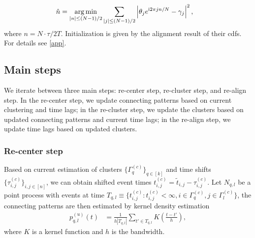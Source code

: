 	\begin{equation}
	\begin{aligned}\label{eq:time shift}
	\hat n&=
	\underset{|n|\leq (N-1)/2}{\arg\min}
	\sum_{|j|\leq (N-1)/2}
	\left| \theta_{j}e^{\complexunit 2\pi j n/N}
	-\gamma_{j} \right|^2
	,
	\end{aligned}
	\end{equation}
where $n=N\cdot\tau/2T$.
Initialization is given by the alignment result of their cdfs.
For details see \ref{app}.





\subsection{Main steps}
We iterate between three main steps: re-center step, re-cluster step, and re-align step.
In the re-center step, we update connecting patterns based on current clustering  and time lags; 
in the re-cluster step, we update the clusters based on updated connecting patterns and current time lags;
in the re-align step, we update time lags based on updated clusters.

\subsubsection*{Re-center step}
Based on current estimation of clusters $\{  \Gamma_q^{(c)} \}_{q\in[k]}$ and time shifts $\{\tau^{(c)}_{i,j}\}_{i,j\in[n]}$, 
we can obtain shifted event times $t^{(c)}_{i,j} = \tilde t_{i,j}-\tau^{(c)}_{i,j}$.
Let $N_{q,l}$ be a point process with events at time $T_{q,l}\equiv\{t_{i,j}^{(c)}: t_{i,j}^{(c)}<\infty, {i\in\Gamma_q^{(c)},j\in\Gamma_l^{(c)} }\}$,
the connecting patterns are then estimated by kernel density estimation
\begin{align}
p_{q,l}^{(u)}(t) &= \frac{1}{h |T_{q,l}|}\sum_{t'\in T_{q,l}} K(\frac{t-t'}{h})
\label{eq: update connecting patterns},
\end{align}
where $K$ is a kernel function and $h$ is the bandwidth.



